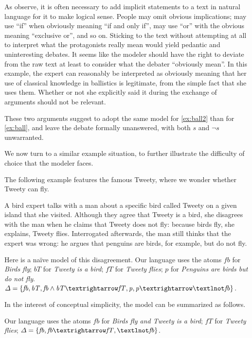 \documentclass[version=3.21, pagesize, twoside=off, bibliography=totoc, DIV=calc, fontsize=12pt, a4paper, french, english]{scrartcl}
\begin{document}
As \citeauthor{besnard_elements_2000} observe, it is often necessary to add implicit statements to a text in natural language for it to make logical sense. People may omit obvious implications; may use “if” when obviously meaning “if and only if”, may use “or” with the obvious meaning “exclusive or”, and so on. Sticking to the text without attempting at all to interpret what the protagonists really mean would yield pedantic and uninteresting debates. It seems like the modeler should have the right to deviate from the raw text at least to consider what the debater “obviously mean”. In this example, the expert can reasonably be interpreted as obviously meaning that her use of classical knowledge in ballistics is legitimate, from the simple fact that she uses them. Whether or not she explicitly said it during the exchange of arguments should not be relevant.

These two arguments suggest to adopt the same model for \cref{ex:ball2} than for \cref{ex:ball}, and leave the debate formally unanswered, with both $\mathit{s}$ and $¬\mathit{s}$ unwarranted.

We now turn to a similar example situation, to further illustrate the difficulty of choice that the modeler faces.

The following example features the famous Tweety, where we wonder whether Tweety can fly.
\begin{example}
	\label{ex:fullTweety}
	A bird expert talks with a man about a specific bird called Tweety on a given island that she visited. Although they agree that Tweety is a bird, she disagrees with the man when he claims that Tweety does not fly: because birds fly, she explains, Tweety flies. Interrogated afterwards, the man still thinks that the expert was wrong: he argues that penguins are birds, for example, but do not fly.
	
	Here is a naïve model of this disagreement.
	Our language uses the atoms 
	$\mathit{fb}$ for \emph{Birds fly}; 
	$\mathit{bT}$ for \emph{Tweety is a bird}; 
	$\mathit{fT}$ for \emph{Tweety flies}; 
	$\mathit{p}$ for \emph{Penguins are birds but do not fly}.
	$\Delta = \set{\mathit{fb}, \mathit{bT},\allowbreak \mathit{fb} \land \mathit{bT} → \mathit{fT}, \mathit{p},\allowbreak \mathit{p} → ¬\mathit{fb}}$.
\end{example}
In the interest of conceptual simplicity, the model can be summarized as follows.
\begin{example}
	\label{ex:shortTweety}
	Our language uses the atoms 
	$\mathit{fb}$ for \emph{Birds fly and Tweety is a bird}; 
	$\mathit{fT}$ for \emph{Tweety flies}; 
	$\Delta = \set{\mathit{fb},\allowbreak \mathit{fb} → \mathit{fT}, ¬\mathit{fb}}$.
\end{example}
\end{document}
